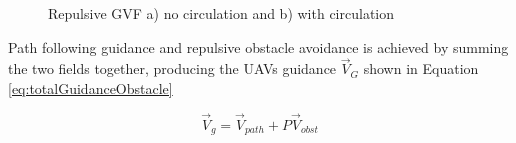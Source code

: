 \documentclass[numbered,pdftex]{ohio-etd}
\begin{document}
\begin{figure}[H]
	\begin{subfigmatrix}{2}%
		\centering	
		\hspace*{0mm}
	\end{subfigmatrix}
	\caption{Repulsive GVF a) no circulation and b) with circulation}
	\label{fig:decayApplied}
\end{figure} 




Path following guidance and repulsive obstacle avoidance is achieved by summing the two fields together, producing the UAVs guidance $\overrightarrow{V}_G$ shown in Equation \ref{eq:totalGuidanceObstacle}

\begin{equation}
\label{eq:totalGuidanceObstacle}
\overrightarrow{V}_g = \overrightarrow{V}_{path} + P\overrightarrow{V}_{obst}
\end{equation}
\end{document}
